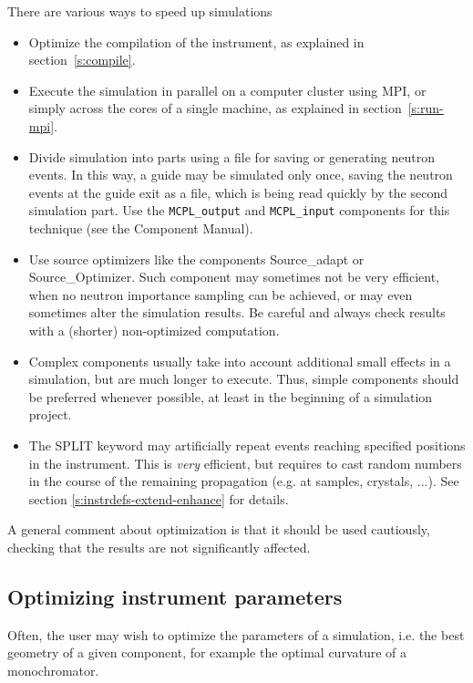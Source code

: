 There are various ways to speed up simulations
\begin{itemize}
\item Optimize the compilation of the instrument, as explained in
  section~\ref{s:compile}.
\item Execute the simulation in parallel on a computer cluster using MPI, or
  simply across the cores of a single machine, as explained in
  section~\ref{s:run-mpi}.
\item Divide simulation into parts using a file for saving or generating neutron
  events. In this way, a guide may be simulated only once, saving the neutron
  events at the guide exit as a file, which is being read quickly by the second
  simulation part. Use the \texttt{MCPL\_output} and \texttt{MCPL\_input}
  components for this technique (see the Component Manual).
\item Use source optimizers like the components Source\_adapt or
  Source\_Optimizer. Such component may sometimes not be very efficient, when no
  neutron importance sampling can be achieved, or may even sometimes alter the
  simulation results. Be careful and always check results with a (shorter)
  non-optimized computation.
\item Complex components usually take into account additional small effects in a
  simulation, but are much longer to execute. Thus, simple components should be
  preferred whenever possible, at least in the beginning of a simulation project.
\item The SPLIT keyword may artificially repeat events reaching specified
  positions in the instrument. This is \emph{very} efficient, but requires to
  cast random numbers in the course of the remaining propagation (e.g. at
  samples, crystals, ...). See section \ref{s:instrdefs-extend-enhance} for
  details.
\end{itemize}
A general comment about optimization is that it should be used cautiously,
checking that the results are not significantly affected.

\subsection{Optimizing instrument parameters}
\label{s:optimize}
Often, the user may wish to optimize the parameters of a simulation, i.e. the
best geometry of a given component, for example the optimal curvature of a
monochromator.

